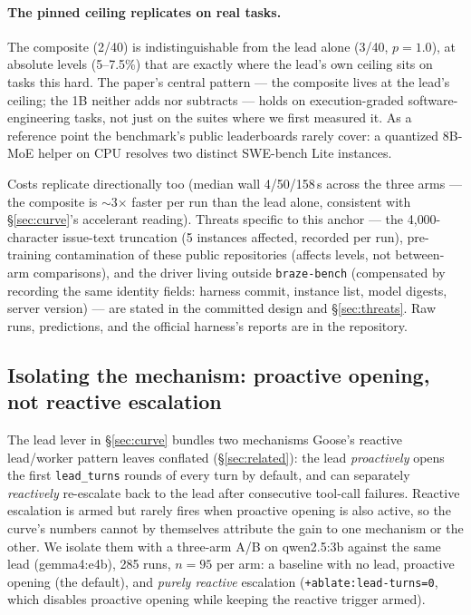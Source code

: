 \documentclass[smallcondensed,natbib]{svjour3}
\begin{document}
\paragraph{The pinned ceiling replicates on real tasks.} The
composite (2/40) is indistinguishable from the lead alone (3/40,
$p{=}1.0$), at absolute levels (5--7.5\%) that are exactly where the
lead's own ceiling sits on tasks this hard. The paper's central
pattern --- the composite lives at the lead's ceiling; the 1B neither
adds nor subtracts --- holds on execution-graded software-engineering
tasks, not just on the suites where we first measured it. As a
reference point the benchmark's public leaderboards rarely cover: a
quantized 8B-MoE helper on CPU resolves two distinct SWE-bench Lite
instances.

Costs replicate directionally too (median wall 4/50/158\,s across the
three arms --- the composite is $\sim$3$\times$ faster per run than the
lead alone, consistent with \S\ref{sec:curve}'s accelerant reading).
Threats specific to this anchor --- the 4{,}000-character issue-text
truncation (5 instances affected, recorded per run), pre-training
contamination of these public repositories (affects levels, not
between-arm comparisons), and the driver living outside
\texttt{braze-bench} (compensated by recording the same identity
fields: harness commit, instance list, model digests, server version)
--- are stated in the committed design and \S\ref{sec:threats}. Raw
runs, predictions, and the official harness's reports are in the
repository.

\subsection{Isolating the mechanism: proactive opening, not reactive
escalation}\label{sec:mechanism}

The lead lever in \S\ref{sec:curve} bundles two mechanisms Goose's
reactive lead/worker pattern \citep{goose} leaves conflated
(\S\ref{sec:related}): the lead \emph{proactively} opens the first
\texttt{lead\_turns} rounds of every turn by default, and can
separately \emph{reactively} re-escalate back to the lead after
consecutive tool-call failures. Reactive escalation is armed but rarely
fires when proactive opening is also active, so the curve's numbers
cannot by themselves attribute the gain to one mechanism or the other.
We isolate them with a three-arm A/B on qwen2.5:3b against the same
lead (gemma4:e4b), 285 runs, $n{=}95$ per arm: a baseline with no lead,
proactive opening (the default), and \emph{purely reactive} escalation
(\texttt{+ablate:lead-turns=0}, which disables proactive opening while
keeping the reactive trigger armed).
\end{document}
